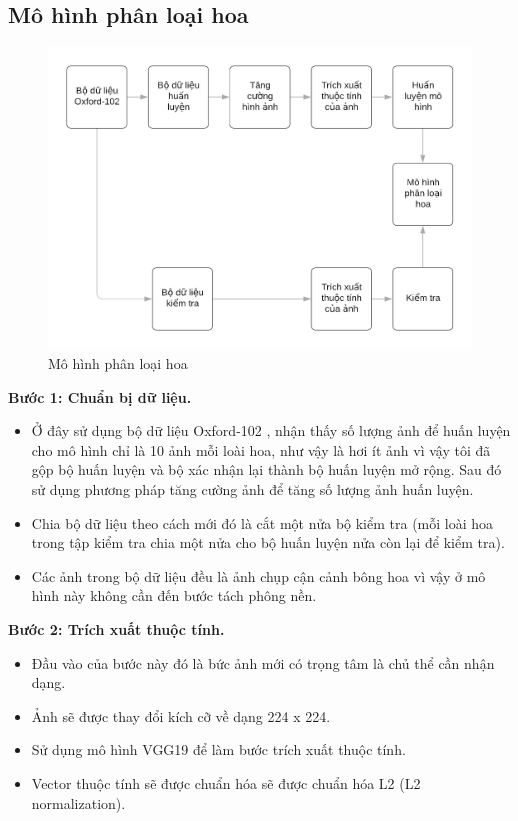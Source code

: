 \documentclass[12pt]{report}
\begin{document}
		\subsection{Mô hình phân loại hoa}
		\begin{figure}[h]
			\centering
			\includegraphics[scale=0.4]{mohinh_phanloai}
			\caption{Mô hình phân loại hoa}
			\label{fig:mohinh_phanloai}
		\end{figure}
										
		\textbf{Bước 1: Chuẩn bị dữ liệu.} 
		\begin{itemize}
			\item Ở đây sử dụng bộ dữ liệu Oxford-102 \cite{cia-Nilsback06}, nhận thấy số lượng ảnh để huấn luyện cho mô hình chỉ là 10 ảnh mỗi loài hoa, như vậy là hơi ít ảnh vì vậy tôi đã gộp bộ huấn luyện và bộ xác nhận lại thành bộ huấn luyện mở rộng. Sau đó sử dụng phương pháp tăng cường ảnh \cite{cia_image_augmentation_2} để tăng số lượng ảnh huấn luyện.
			\item Chia bộ dữ liệu theo cách mới đó là cắt một nửa bộ kiểm tra (mỗi loài hoa trong tập kiểm tra chia một nửa cho bộ huấn luyện nửa còn lại để kiểm tra).
			\item Các ảnh trong bộ dữ liệu đều là ảnh chụp cận cảnh bông hoa vì vậy ở mô hình này không cần đến bước tách phông nền.
		\end{itemize}
										
		\textbf{Bước 2: Trích xuất thuộc tính.} 
		\begin{itemize}
			\item Đầu vào của bước này đó là bức ảnh mới có trọng tâm là chủ thể cần nhận dạng.
			\item Ảnh sẽ được thay đổi kích cỡ về dạng 224 x 224.
			\item Sử dụng mô hình VGG19 \cite{cia_vgg19} để làm bước trích xuất thuộc tính.
			\item Vector thuộc tính sẽ được chuẩn hóa sẽ được chuẩn hóa L2 (L2 normalization).
		\end{itemize}
										
\end{document}
